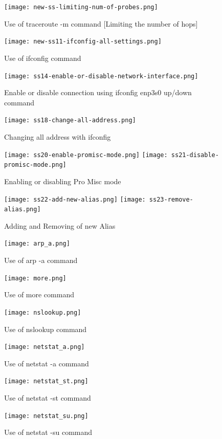 \documentclass[11pt]{article}
\begin{document}
\begin{figure}[!h]
	\centering
	\texttt{[image: new-ss-limiting-num-of-probes.png]}
	\caption{Use of traceroute -m command [Limiting the number of hops]}
\end{figure}

\newpage
\begin{figure}[!h]
	\centering
	\texttt{[image: new-ss11-ifconfig-all-settings.png]}
	\caption{Use of ifconfig command}
\end{figure}

\newpage
\begin{figure}[!h]
	\centering
	\texttt{[image: ss14-enable-or-disable-network-interface.png]}
	\caption{Enable or disable connection using ifconfig enp3s0 up/down command}
\end{figure}

\begin{figure}[!h]
	\centering
	\texttt{[image: ss18-change-all-address.png]}
	\caption{Changing all address with ifconfig}
\end{figure}


\begin{figure}[!h]
	\centering
	\texttt{[image: ss20-enable-promisc-mode.png]}
	\texttt{[image: ss21-disable-promisc-mode.png]}
	\caption{Enabling or disabling Pro Misc mode}
\end{figure}

\begin{figure}[!h]
	\centering
	\texttt{[image: ss22-add-new-alias.png]}
	\texttt{[image: ss23-remove-alias.png]}
	\caption{Adding and Removing of new Alias}
\end{figure}

\newpage
\begin{figure}[!h]
	\centering
	\texttt{[image: arp\_a.png]}
	\caption{Use of arp -a command}
\end{figure}

\begin{figure}[!h]
	\centering
	\texttt{[image: more.png]}
	\caption{Use of more command}
\end{figure}

\begin{figure}[!h]
	\centering
	\texttt{[image: nslookup.png]}
	\caption{Use of nslookup command}
\end{figure}

\newpage
\begin{figure}[!h]
	\centering
	\texttt{[image: netstat\_a.png]}
	\caption{Use of netstat -a command}
\end{figure}

\newpage
\begin{figure}[!h]
	\centering
	\texttt{[image: netstat\_st.png]}
	\caption{Use of netstat -st command}
\end{figure}

\newpage
\begin{figure}[!h]
	\centering
	\texttt{[image: netstat\_su.png]}
	\caption{Use of netstat -su command}
\end{figure}

% 
% 
\end{document}
